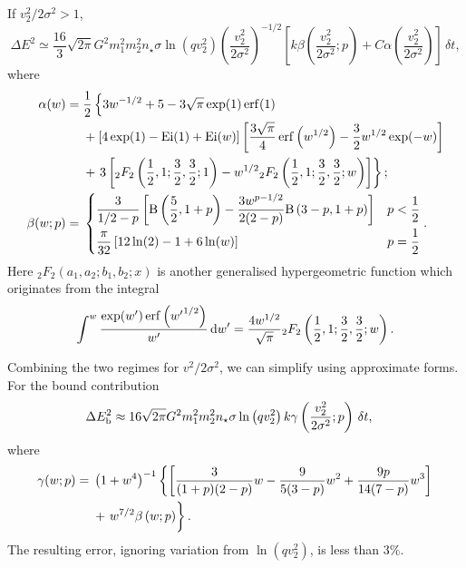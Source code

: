 If $v_2^2/2\sigma^2 > 1$,
\begin{equation}
\Delta E^2 \simeq \dfrac{16}{3}\sqrt{2\pi}G^2m_1^2 m_2^2n_\star\sigma\ln\left(qv_2^2\right) \left(\dfrac{v_2^2}{2\sigma^2}\right)^{-1/2} \left[k\beta\left(\dfrac{v_2^2}{2\sigma^2};p\right) + C\alpha\left(\dfrac{v_2^2}{2\sigma^2}\right)\right]\,\delta t,
\end{equation}
where
\begin{align}
\alpha(w) = {} & \recip{2}\left\{3w^{-1/2} + 5 - 3\sqrt{\pi}\exp(1)\erf(1) \right. \nonumber\\*
 {} & + \left[4\exp(1) - \Ei(1) + \Ei(w)\right]\left[\dfrac{3\sqrt{\pi}}{4}\erf\left(w^{1/2}\right) - \dfrac{3}{2}w^{1/2}\exp(-w)\right] \nonumber \\*
 {} & + \left. 3\left[{_2F_2}\left(\dfrac{1}{2},1;\dfrac{3}{2},\dfrac{3}{2};1\right) - w^{1/2}{_2F_2}\left(\dfrac{1}{2},1;\dfrac{3}{2},\dfrac{3}{2};w\right)\right]\right\}; \\
\beta(w;p) = {} & \begin{cases} \dfrac{3}{1/2 - p}\left[\Beta\left(\dfrac{5}{2},1+p\right) - \dfrac{3w^{p-1/2}}{2(2-p)}\Beta\left(3-p,1+p\right)\right] \vspace{1mm} & p < \recip{2} \\
\dfrac{\pi}{32}\left[12 \ln(2) - 1 + 6 \ln(w)\right] & p = \recip{2} \end{cases} . 
\end{align}
Here ${_2F_2}(a_1,a_2;b_1,b_2;x)$ is another generalised hypergeometric function which originates from the integral
\begin{equation}
\int_{}^{w}{\dfrac{\exp(w')\operatorname{erf}\left({w'}^{1/2}\right)}{w'}}\,\mathrm{d}{w'} = \dfrac{4w^{1/2}}{\sqrt{\pi}}{_2F_2}\left(\dfrac{1}{2},1;\dfrac{3}{2},\dfrac{3}{2};w\right).
\end{equation}

Combining the two regimes for $v^2/2\sigma^2$, we can simplify using approximate forms. For the bound contribution 
\begin{align}
\Delta E_\mathrm{b}^2 \approx {} & 16\sqrt{2\pi}G^2m_1^2m_2^2n_\star\sigma\ln\left(qv_2^2\right) k \gamma\left(\dfrac{v_2^2}{2\sigma^2};p\right)\,\delta t,
\label{eq:Bound-approx}
\end{align}
where
\begin{align}
\gamma(w;p) = {} & \left(1 + w^4\right)^{-1}\left\{\left[\dfrac{3}{(1 + p)(2 - p)}w - \dfrac{9}{5(3-p)}w^2 + \dfrac{9p}{14(7-p)}w^3 \right] \right. \nonumber \\*
{} & + \left. \vphantom{\left[\dfrac{0}{p}\right]} w^{7/2}\beta\left(w;p\right)\right\}.
\end{align}
The resulting error, ignoring variation from $\ln\left(qv_2^2\right)$, is less than $3\%$.

